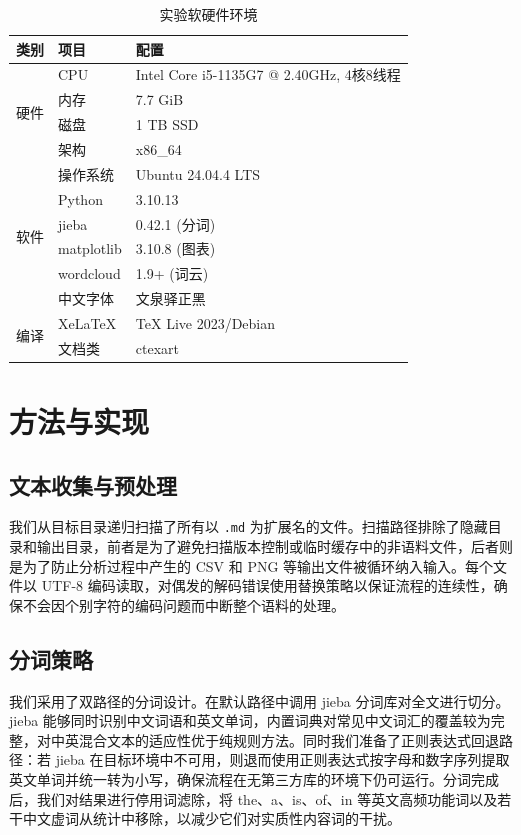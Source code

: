 \documentclass[12pt,a4paper]{ctexart}
\begin{document}
\begin{table}[htbp]
\centering
\caption{实验软硬件环境}
\label{tab:env}
\begin{tabular}{@{}lll@{}}
\toprule
类别 & 项目 & 配置 \\
\midrule
\multirow{4}{*}{硬件} & CPU & Intel Core i5-1135G7 @ 2.40GHz, 4核8线程 \\
& 内存 & 7.7 GiB \\
& 磁盘 & 1 TB SSD \\
& 架构 & x86\_64 \\
\midrule
\multirow{6}{*}{软件} & 操作系统 & Ubuntu 24.04.4 LTS \\
& Python & 3.10.13 \\
& jieba & 0.42.1 (分词) \\
& matplotlib & 3.10.8 (图表) \\
& wordcloud & 1.9+ (词云) \\
& 中文字体 & 文泉驿正黑 \\
\midrule
\multirow{2}{*}{编译} & XeLaTeX & TeX Live 2023/Debian \\
& 文档类 & ctexart \\
\bottomrule
\end{tabular}
\end{table}

\section{方法与实现}

\subsection{文本收集与预处理}

我们从目标目录递归扫描了所有以 \texttt{.md} 为扩展名的文件。扫描路径排除了隐藏目录和输出目录，前者是为了避免扫描版本控制或临时缓存中的非语料文件，后者则是为了防止分析过程中产生的 CSV 和 PNG 等输出文件被循环纳入输入。每个文件以 UTF-8 编码读取，对偶发的解码错误使用替换策略以保证流程的连续性，确保不会因个别字符的编码问题而中断整个语料的处理。

\subsection{分词策略}

我们采用了双路径的分词设计。在默认路径中调用 jieba 分词库对全文进行切分。jieba 能够同时识别中文词语和英文单词，内置词典对常见中文词汇的覆盖较为完整，对中英混合文本的适应性优于纯规则方法。同时我们准备了正则表达式回退路径：若 jieba 在目标环境中不可用，则退而使用正则表达式按字母和数字序列提取英文单词并统一转为小写，确保流程在无第三方库的环境下仍可运行。分词完成后，我们对结果进行停用词滤除，将 the、a、is、of、in 等英文高频功能词以及若干中文虚词从统计中移除，以减少它们对实质性内容词的干扰。
\end{document}
